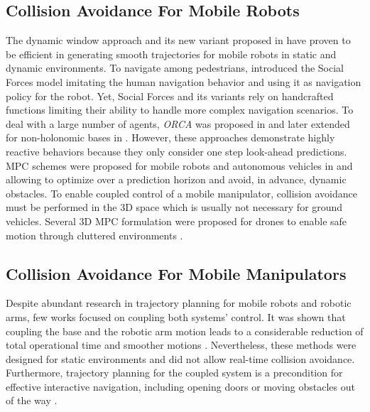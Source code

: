 \subsection{Collision Avoidance For Mobile Robots}
The dynamic window approach \cite{Fox1997} and its new variant proposed in \cite{Zhang2019} have proven to be efficient in generating smooth trajectories for mobile robots in static and dynamic environments. %
To navigate among pedestrians, \cite{Ferrer2013} introduced the Social Forces model imitating the human navigation behavior and using it as navigation policy for the robot.%
Yet, Social Forces and its variants rely on handcrafted functions limiting their ability to handle more complex navigation scenarios.
To deal with a large number of agents, \textit{ORCA} was proposed in \cite{VanDenBerg2011}
and later extended for non-holonomic bases in \cite{Alonso-Mora2012a}. However, these approaches demonstrate highly reactive behaviors because they only consider one step look-ahead predictions.
MPC schemes were proposed for mobile robots and autonomous vehicles in
\cite{Brito2019} and \cite{Schwarting2018} allowing to optimize over a prediction horizon and avoid, in advance, dynamic obstacles.
To enable coupled control of a mobile manipulator, collision avoidance must be performed in
the 3D space which is usually not necessary for ground vehicles. 
Several 3D MPC formulation were proposed for drones to enable safe motion through
cluttered environments \cite{Tordesillas2019,Liu2017}.

\subsection{Collision Avoidance For Mobile Manipulators}
Despite abundant research in trajectory planning for mobile robots and robotic arms, few works focused on coupling both systems' control. It was shown that coupling the base and the robotic arm motion leads to a considerable reduction of total operational time and smoother motions \cite{Thakar2018, Thakar2019}. Nevertheless, 
these methods were designed for static environments and did not allow real-time collision avoidance. Furthermore, trajectory planning for the coupled system is a precondition for effective interactive navigation, including opening doors \cite{Jain2009, Chitta2010} or moving obstacles out of the way \cite{Li2019}.

